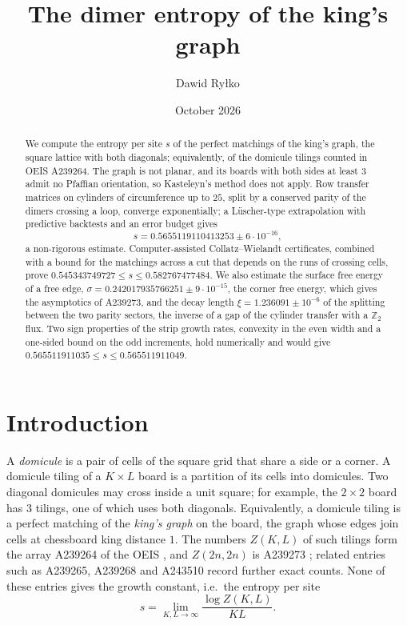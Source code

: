 \documentclass[11pt]{amsart}
\title{The dimer entropy of the king's graph}
\author{Dawid Ry\l{}ko}
\date{October 2026}
\theoremstyle{definition}
\theoremstyle{remark}
\newcommand{\Z}{\mathbb{Z}}
\begin{document}
\begin{abstract}
We compute the entropy per site $s$ of the perfect matchings of the king's graph, the square
lattice with both diagonals; equivalently, of the domicule tilings counted in OEIS A239264. The
graph is not planar, and its boards with both sides at least $3$ admit no Pfaffian orientation, so
Kasteleyn's method does not apply. Row transfer matrices on cylinders of circumference up to $25$,
split by a conserved parity of the dimers crossing a loop, converge exponentially; a L\"uscher-type
extrapolation with predictive backtests and an error budget gives
\[
  s = 0.5655119110413253 \pm 6\cdot 10^{-16},
\]
a non-rigorous estimate. Computer-assisted Collatz--Wielandt certificates, combined with a bound
for the matchings across a cut that depends on the runs of crossing cells, prove
$0.545343749727 \le s \le 0.582767477484$. We also estimate the surface free energy of a free edge,
$\sigma = 0.242017935766251 \pm 9\cdot 10^{-15}$, the corner free energy, which gives the asymptotics of
A239273, and the decay length $\xi = 1.236091 \pm 10^{-6}$ of the splitting between the two parity
sectors, the inverse of a gap of the cylinder transfer with a $\Z_2$ flux. Two sign properties of the strip growth rates, convexity in the even width and a
one-sided bound on the odd increments, hold numerically and would give
$0.565511911035 \le s \le 0.565511911049$.
\end{abstract}

\maketitle

\section{Introduction}

A \emph{domicule} is a pair of cells of the square grid that share a side or a corner. A domicule
tiling of a $K \times L$ board is a partition of its cells into domicules. Two diagonal domicules
may cross inside a unit square; for example, the $2\times 2$ board has $3$ tilings, one of which
uses both diagonals. Equivalently, a domicule tiling is a
perfect matching of the \emph{king's graph} on the board, the graph whose edges join cells at
chessboard king distance $1$. The numbers $Z(K, L)$ of such tilings form the array
A239264 of the OEIS \cite{oeisA239264}, and $Z(2n, 2n)$ is A239273 \cite{oeisA239273}; related
entries such as A239265, A239268 and A243510 \cite{oeisA239265,oeisA239268,oeisA243510} record
further exact counts. None of these entries gives the growth constant, i.e.\ the entropy per
site
\[
  s = \lim_{K, L \to \infty} \frac{\log Z(K, L)}{KL}.
\]
\end{document}
